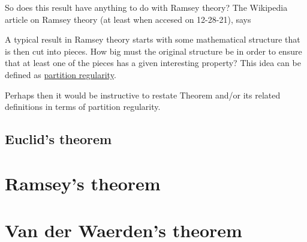 \documentclass{article}
\begin{document}
So does this result have anything to do with Ramsey theory?
The Wikipedia article on Ramsey theory \cite{wiki:ramsey2021} (at least when accesed on 12-28-21), says

\begin{displayquote}
	A typical result in Ramsey theory starts with some mathematical structure that is then cut into pieces. How big must the original structure be in order to ensure that at least one of the pieces has a given interesting property? This idea can be defined as \href{https://en.wikipedia.org/wiki/Partition_regularity}{partition regularity}.
\end{displayquote}

\noindent Perhaps then it would be instructive to restate Theorem  and/or its related definitions in terms of partition regularity.

\subsection{Euclid's theorem}

\section{Ramsey's theorem}

\section{Van der Waerden's theorem}



\end{document}
